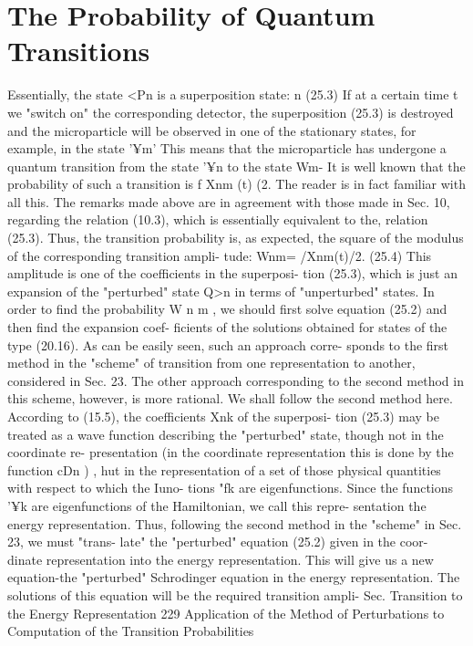 \documentclass[a4paper,sfsidenotes,colorlinks=true]{tufte-book}
\numberwithin{equation}{section}
\numberwithin{figure}{section}
\begin{document}
{{{{{{\section{The Probability of Quantum Transitions}
Essentially, the state <Pn is a superposition state: n
(25.3)
If at a certain time t we "switch on" the corresponding detector, the superposition (25.3) is destroyed and the microparticle will be observed in one of the stationary states, for example, in the state '¥m' This means that the microparticle has undergone a quantum transition from the state '¥n to the state Wm- It is well known that the probability of such a transition is f Xnm (t) (2.
The reader is in fact familiar with all this. The remarks made above are in agreement with those made in Sec. 10, regarding the relation (10.3), which is essentially equivalent to the, relation (25.3).
Thus, the transition probability is, as expected, the square of the modulus of the corresponding transition ampli- tude:
Wnm= /Xnm(t)/2.	(25.4)
This amplitude is one of the coefficients in the superposi- tion (25.3), which is just an expansion of the "perturbed" state Q>n in terms of "unperturbed" states.
In	order	to	find	the	probability	W n m ,	we	should	first solve equation (25.2) and then find the expansion coef- ficients of the solutions obtained for states of the type (20.16). As can be easily seen, such an approach corre- sponds to the first method in the "scheme" of transition from one representation to another, considered in Sec. 23. The other approach corresponding to the second method in this scheme, however, is more rational. We shall follow the second method here.
According to (15.5), the coefficients Xnk of the superposi- tion (25.3) may be treated as a wave function describing the "perturbed" state, though not in the coordinate re- presentation (in the coordinate representation this is done by the function cDn ) , hut in the representation of a set of those physical quantities with respect to which the Iuno- tions "fk are eigenfunctions. Since the functions '¥k are eigenfunctions of the Hamiltonian, we call this repre- sentation the energy representation. Thus, following the second method in the "scheme" in Sec. 23, we must "trans- late" the "perturbed" equation (25.2) given in the coor- dinate representation into the energy representation. This will give us a new equation-the "perturbed" Schrodinger equation in the energy representation. The solutions of this equation will be the required transition ampli-
Sec.
Transition to the Energy Representation
229
Application of the Method of Perturbations to Computation of the Transition Probabilities
}}}}}}
\end{document}
